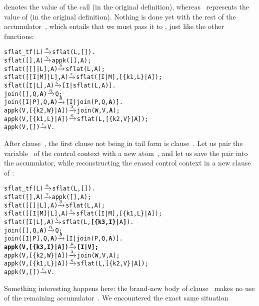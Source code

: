  denotes the value of the call  (in
the original definition), whereas ~represents the value of
 (in the original definition). Nothing is done yet
with the rest of the accumulator~, which entails that we
must pass it to , just like the other functions:
\begin{alltt}
sflat_tf(L)        \(\smashedrightarrow{\alpha}\) sflat(L,[]).
sflat(       [],A) \(\smashedrightarrow{\gamma}\) appk([],A);
sflat(   [[]|L],A) \(\smashedrightarrow{\delta}\) sflat(L,A);
sflat([[I|M]|L],A) \(\smashedrightarrow{\epsilon}\) sflat([I|M],[\{k1,L\}|A]);
sflat(    [I|L],A) \(\smashedrightarrow{\zeta}\) [I|sflat(L,A)].
join(   [],Q,\textbf{A})    \(\smashedrightarrow{\eta}\) Q;\hfill% A \emph{unused yet}
join([I|P],Q,\textbf{A})    \(\smashedrightarrow{\theta}\) [I|join(P,Q,\textbf{A})].
appk(V,[\{k2,W\}|A]) \(\smashedrightarrow{\lambda}\) join(W,V,\textbf{A});\hfill% \emph{Passed} A
appk(V,[\{k1,L\}|A]) \(\smashedrightarrow{\kappa}\) sflat(L,[\{k2,V\}|A]);
appk(V,        []) \(\smashedrightarrow{\iota}\) V.
\end{alltt}
After clause~\clause{\epsilon}, the first clause not being in tail
form is clause~\clause{\zeta}. Let us pair the variable~ of
the control context \erlcode{[I|\textvisiblespace]} with a new
atom~, and let us save the pair into the accumulator,
while reconstructing the erased control context in a new
clause~\clause{\mu} of :
\begin{alltt}
sflat_tf(L)        \(\smashedrightarrow{\alpha}\) sflat(L,[]).
sflat(       [],A) \(\smashedrightarrow{\gamma}\) appk([],A);
sflat(   [[]|L],A) \(\smashedrightarrow{\delta}\) sflat(L,A);
sflat([[I|M]|L],A) \(\smashedrightarrow{\epsilon}\) sflat([I|M],[\{k1,L\}|A]);
sflat(    [I|L],A) \(\smashedrightarrow{\zeta}\) sflat(L,\textbf{[\{k3,I\}|}A\textbf{]}).\hfill% I \emph{saved}
join(   [],Q,\textbf{A})    \(\smashedrightarrow{\eta}\) Q;\hfill% A \emph{unused yet}
join([I|P],Q,\textbf{A})    \(\smashedrightarrow{\theta}\) [I|join(P,Q,\textbf{A})].
\textbf{appk(V,[\{k3,I\}|A]) \(\smashedrightarrow{\mu}\) [I|V];}\hfill% A \emph{unused yet}
appk(V,[\{k2,W\}|A]) \(\smashedrightarrow{\lambda}\) join(W,V,A);
appk(V,[\{k1,L\}|A]) \(\smashedrightarrow{\kappa}\) sflat(L,[\{k2,V\}|A]);
appk(V,        []) \(\smashedrightarrow{\iota}\) V.
\end{alltt}
Something interesting happens here: the brand\hyp{}new body of
clause~\clause{\mu} makes no use of the remaining
accumulator~. We encountered the exact same situation
